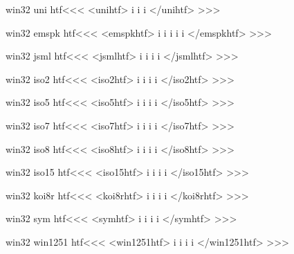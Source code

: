 \documentclass{article}
\begin{document}
\<win32 uni htf\><<<
<unihtf>
i%
i%
i%
</unihtf>
>>>



\<win32 emspk htf\><<<
<emspkhtf>
i%
i%
i%
i%
i%
</emspkhtf>
>>>


\<win32 jsml htf\><<<
<jsmlhtf>
i%
i%
i%
i%
</jsmlhtf>
>>>


\<win32 iso2 htf\><<<
<iso2htf>
i%
i%
i%
i%
</iso2htf>
>>>


\<win32 iso5 htf\><<<
<iso5htf>
i%
i%
i%
i%
</iso5htf>
>>>



\<win32 iso7 htf\><<<
<iso7htf>
i%
i%
i%
i%
</iso7htf>
>>>



\<win32 iso8 htf\><<<
<iso8htf>
i%
i%
i%
i%
</iso8htf>
>>>


\<win32 iso15 htf\><<<
<iso15htf>
i%
i%
i%
i%
</iso15htf>
>>>



\<win32 koi8r htf\><<<
<koi8rhtf>
i%
i%
i%
i%
</koi8rhtf>
>>>


\<win32 sym htf\><<<                                                     %
<symhtf>
i%
i%
i%
i%
</symhtf>
>>>



\<win32 win1251 htf\><<<                                                     %
<win1251htf>
i%
i%
i%
i%
</win1251htf>
>>>
\end{document}
